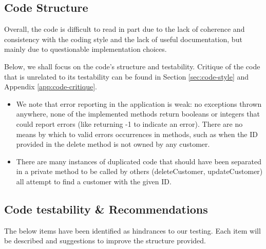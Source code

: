 
\subsection{Code Structure} 
\label{sec:code-structure}
Overall, the code is difficult to read in part due to the lack of coherence and consistency with the coding style and the lack of useful documentation, but mainly due to questionable implementation choices. 

Below, we shall focus on the code's structure and testability. Critique of the code that is unrelated to its testability can be found in Section \ref{sec:code-style} and Appendix \ref{app:code-critique}. 

\begin{itemize}
	\item We note that error reporting in the application is weak: no exceptions thrown anywhere, none of the implemented methods return booleans or integers that could report errors (like returning -1 to indicate an error). There are no means by which  to valid errors occurrences in methods, such as when the ID provided in the delete method is not owned by any customer. 
	\item There are many instances of duplicated code that should have been separated in a private method to be called by others (deleteCustomer, updateCustomer) all attempt to find a customer with the given ID. 
\end{itemize}

\subsection{Code testability \& Recommendations}
The below items have been identified as hindrances to our testing. Each item will be described and suggestions to improve the structure provided. 

